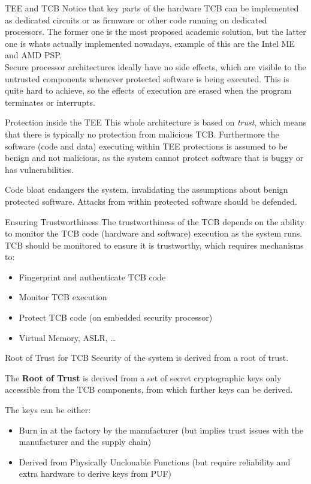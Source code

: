 \begin{section}{TEE and TCB}
  Notice that key parts of the hardware TCB can be implemented as dedicated circuits or as firmware
  or other code running on dedicated processors. The former one is the most proposed academic 
  solution, but the latter one is whats actually implemented nowadays, example of this are the Intel
  ME and AMD PSP.\\

  Secure processor architectures ideally have no side effects, which are visible to the untrusted
  components whenever protected software is being executed. This is quite hard to achieve, so the
  effects of execution are erased when the program terminates or interrupts.
  \begin{subsection}{Protection inside the TEE}
    This whole architecture is based on \textit{trust}, which means that there is typically no
    protection from malicious TCB. Furthermore the software (code and data) executing within TEE
    protections is assumed to be benign and not malicious, as the system cannot protect software
    that is buggy or has vulnerabilities.\\
    \begin{boxH}
      Code bloat endangers the system, invalidating the assumptions about benign protected software.
      Attacks from within protected software should be defended. 
    \end{boxH}
  \end{subsection}
  \begin{subsection}{Ensuring Trustworthiness}
    The trustworthiness of the TCB depends on the ability to monitor the TCB code (hardware and
    software) execution as the system runs. TCB should be monitored to ensure it is trustworthy,
    which requires mechanisms to:
    \begin{itemize}
      \item Fingerprint and authenticate TCB code
      \item Monitor TCB execution
      \item Protect TCB code (on embedded security processor)
      \item Virtual Memory, ASLR, \dots
    \end{itemize}
  \end{subsection}
  \begin{subsection}{Root of Trust for TCB}
    Security of the system is derived from a root of trust.
    \begin{boxH}
      The \textbf{Root of Trust} is derived from a set of secret cryptographic keys only accessible
      from the TCB components, from which further keys can be derived.
    \end{boxH}
    The keys can be either:
    \begin{itemize}
      \item Burn in at the factory by the manufacturer (but implies trust issues with the
        manufacturer and the supply chain)
      \item Derived from Physically Unclonable Functions (but require reliability and extra hardware
        to derive keys from PUF)
    \end{itemize}


\end{subsection}
\end{section}
